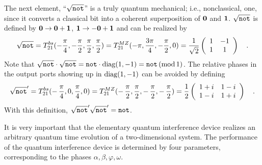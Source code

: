 The next element, ``$\sqrt{{\tt not}}$'' is a truly quantum
mechanical; i.e., nonclassical, one, since it converts a classical bit
into
a coherent superposition of $ {\bf 0} $ and $ {\bf 1} $.
$\sqrt{{\tt not}}$ is defined by
$ {\bf 0}  \rightarrow   {\bf 0}  +  {\bf 1} $,
$ {\bf 1}  \rightarrow  - {\bf 0}  +  {\bf 1} $ and can
be realized by
\begin{equation}
\sqrt{{\tt not}} =
T^{bs}_{21}(-{\pi \over 4},-{\pi \over 2},
{\pi \over 2},
{\pi \over 2})=
T^{MZ}_{21}(-\pi , {3\pi \over 4} ,-{\pi \over 2},0 )=
{1 \over \sqrt{2}}
\left(
\begin{array}{cc}
1&-1
\\
1&1
 \end{array}
\right)
\quad .
\end{equation}
Note that $\sqrt{{\tt not}}\cdot \sqrt{{\tt not}} = {\tt not}\cdot
{\rm diag}(1,-1)={\tt not}\, ({\rm mod }\, 1)$.
The relative phases in the output ports showing up in ${\rm
diag}(1,-1)$ can be avoided by defining
\begin{equation}
\sqrt{{\tt not}}' =
T^{bs}_{21}(-\,{\pi \over 4},0,
{\pi \over 4},
0)=
T^{MZ}_{21}(-\,{\pi \over 2} , {\pi \over 2} ,-\,{\pi \over 2},
-\,{\pi \over 2}
 )=
{1 \over 2}
\left(
\begin{array}{cc}
1+i&1-i
\\
1-i&1+i
 \end{array}
\right)
\quad .
\end{equation}
With this definition,
$
\sqrt{{\tt not}}'
\sqrt{{\tt not}}' = {\tt not}$.




It is very important that the elementary quantum
interference device realizes an arbitrary
quantum time evolution  of a two-dimensional system.
The  performance of the quantum interference device is determined by
four parameters, corresponding to the phases
$\alpha ,\beta ,\varphi, \omega$.


